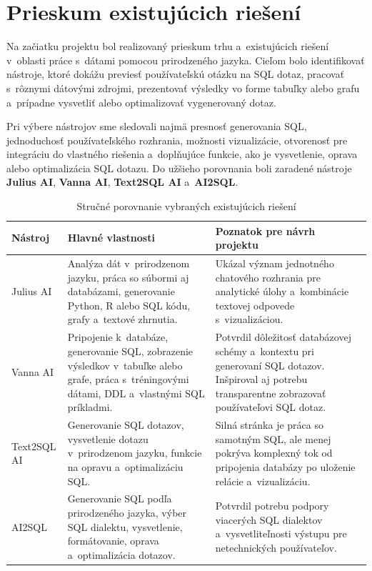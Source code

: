 \documentclass[a4paper, 12pt]{article}
\begin{document}
\clearpage

\section{Prieskum existujúcich riešení}

Na začiatku projektu bol realizovaný prieskum trhu a~existujúcich riešení v~oblasti práce s~dátami pomocou prirodzeného jazyka. Cieľom bolo identifikovať nástroje, ktoré dokážu previesť používateľskú otázku na SQL dotaz, pracovať s~rôznymi dátovými zdrojmi, prezentovať výsledky vo forme tabuľky alebo grafu a~prípadne vysvetliť alebo optimalizovať vygenerovaný dotaz.

Pri výbere nástrojov sme sledovali najmä presnosť generovania SQL, jednoduchosť používateľského rozhrania, možnosti vizualizácie, otvorenosť pre integráciu do vlastného riešenia a~doplňujúce funkcie, ako je vysvetlenie, oprava alebo optimalizácia SQL dotazu. Do užšieho porovnania boli zaradené nástroje \textbf{Julius AI}, \textbf{Vanna AI}, \textbf{Text2SQL AI} a~\textbf{AI2SQL}.

\begin{table}[H]
\centering
\small
\begin{tabular}{p{2.4cm}p{5.3cm}p{5.6cm}}
\toprule
\textbf{Nástroj} & \textbf{Hlavné vlastnosti} & \textbf{Poznatok pre návrh projektu} \\
\midrule
Julius AI & Analýza dát v~prirodzenom jazyku, práca so súbormi aj databázami, generovanie Python, R alebo SQL kódu, grafy a~textové zhrnutia. & Ukázal význam jednotného chatového rozhrania pre analytické úlohy a~kombinácie textovej odpovede s~vizualizáciou. \\
\midrule
Vanna AI & Pripojenie k~databáze, generovanie SQL, zobrazenie výsledkov v~tabuľke alebo grafe, práca s~tréningovými dátami, DDL a~vlastnými SQL príkladmi. & Potvrdil dôležitosť databázovej schémy a~kontextu pri generovaní SQL dotazov. Inšpiroval aj potrebu transparentne zobrazovať používateľovi SQL dotaz. \\
\midrule
Text2SQL AI & Generovanie SQL dotazov, vysvetlenie dotazu v~prirodzenom jazyku, funkcie na opravu a~optimalizáciu SQL. & Silná stránka je práca so samotným SQL, ale menej pokrýva komplexný tok od pripojenia databázy po uloženie relácie a~vizualizáciu. \\
\midrule
AI2SQL & Generovanie SQL podľa prirodzeného jazyka, výber SQL dialektu, vysvetlenie, formátovanie, oprava a~optimalizácia dotazov. & Potvrdil potrebu podpory viacerých SQL dialektov a~vysvetliteľnosti výstupu pre netechnických používateľov. \\
\bottomrule
\end{tabular}
\caption{Stručné porovnanie vybraných existujúcich riešení}
\end{table}
\end{document}

